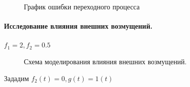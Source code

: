 \documentclass[a4paper, 11pt]{article}
\begin{document}
\begin{figure}[h!]
    \caption{График ошибки переходного процесса}
    \label{tree}
\end{figure}

\newpage
\paragraph{Исследование влияния внешних возмущений.\\} $f_1=2,  f_2=0.5$

\begin{figure}[h]
    \caption{Схема моделирования влияния внешних возмущений.}
    \label{tree}
\end{figure}

Зададим $f_2(t) = 0, g(t) = 1(t)$
\end{document}
